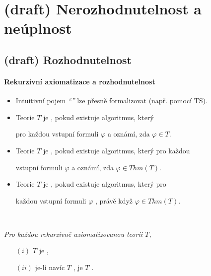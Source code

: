 \chapter{(draft) Nerozhodnutelnost a neúplnost}\todo




\section{(draft) Rozhodnutelnost}\todo

\subsubsection*{Rekurzivní axiomatizace a rozhodnutelnost}
    \begin{itemize}
    \item Intuitivní pojem \emph{``''} lze přesně formalizovat (např. pomocí TS).
    \smallskip
    
    \item Teorie $T$ je , pokud existuje algoritmus, který
    \smallskip
    
    pro každou vstupní formuli $\varphi$  a oznámí, zda $\varphi \in T$.
    \smallskip
    
    \item Teorie $T$ je , pokud existuje algoritmus, který pro každou
    \smallskip
    
    vstupní formuli $\varphi$  a oznámí, zda $\varphi \in Thm(T)$.
    \smallskip
    
    \item Teorie $T$ je , pokud existuje algoritmus, který pro
    \smallskip
    
    každou vstupní formuli $\varphi$ , právě když $\varphi \in Thm(T)$.
    \end{itemize}
    \smallskip
    
    {\bf {}}\ \ {\it Pro každou rekurzivně axiomatizovanou teorii $T$,

    \begin{enumerate}
    \item [$(i)$] $T$ je ,
    \smallskip
    
    \item [$(ii)$] je-li navíc $T$ , je $T$ .
    \end{enumerate}}
    \smallskip
    
